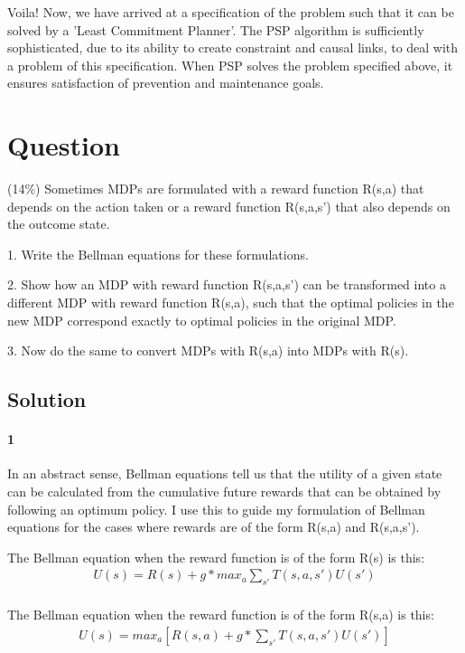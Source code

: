 \documentclass[10pt]{article}
\begin{document}
Voila! Now, we have arrived at a specification of the problem such that it can be solved by a 'Least Commitment Planner'. The PSP algorithm is sufficiently sophisticated, due to its ability to create constraint and causal links, to deal with a problem of this specification. When PSP solves the problem specified above, it ensures satisfaction of prevention and maintenance goals.

\section{Question}
 (14\%) Sometimes MDPs are formulated with a reward function R(s,a) that depends on the action taken or a reward function R(s,a,s') that also depends on the outcome state.

1. Write the Bellman equations for these formulations.

2. Show how an MDP with reward function R(s,a,s') can be transformed into a different MDP with reward function R(s,a), such that the optimal policies in the new MDP correspond exactly to optimal policies in the original MDP.

3. Now do the same to convert MDPs with R(s,a) into MDPs with R(s).

\subsection{Solution}

\paragraph{1} In an abstract sense, Bellman equations tell us that the utility of a given state can be calculated from the cumulative future rewards that can be obtained by following an optimum policy. I use this to guide my formulation of Bellman equations for the cases where rewards are of the form R(s,a) and R(s,a,s').

The Bellman equation when the reward function is of the form R(s) is this:
\begin{eqnarray}
U(s)=R(s)+g*max_{a}\sum_{s'}T(s,a,s')U(s')\\
\end{eqnarray}

The Bellman equation when the reward function is of the form R(s,a) is this:
\begin{eqnarray}
U(s)=max_{a}[R(s,a) + g*\sum_{s'}T(s,a,s')U(s')]\\
\end{eqnarray}
\end{document}
